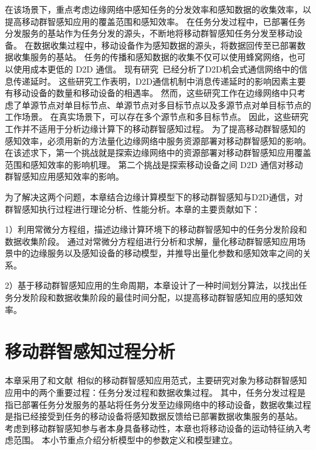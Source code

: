 在该场景下，重点考虑边缘网络中感知任务的分发效率和感知数据的收集效率，以提高移动群智感知应用的覆盖范围和感知效率。
在任务分发过程中，已部署任务分发服务的基站作为任务分发的源头，不断地将移动群智感知任务分发至移动设备。
在数据收集过程中，移动设备作为感知数据的源头，将数据回传至已部署数据收集服务的基站。
任务的传播和感知数据的收集不仅可以使用蜂窝网络，也可以使用成本更低的 D2D 通信。
现有研究~\cite{DBLP:conf/wcnc/QinF13,DBLP:journals/twc/LiW14,DBLP:journals/winet/ZhaoMLT18}已经分析了D2D机会式通信网络中的信息传递延时。
这些研究工作表明，D2D通信机制中消息传递延时的影响因素主要有移动设备的数量和移动设备的相遇率。
然而，这些研究工作在边缘网络中只考虑了单源节点对单目标节点、单源节点对多目标节点以及多源节点对单目标节点的工作场景。
在真实场景下，可以存在多个源节点和多目标节点。
因此，这些研究工作并不适用于分析边缘计算下的移动群智感知过程。
为了提高移动群智感知的感知效率，必须用新的方法量化边缘网络中服务资源部署对移动群智感知的影响。
在该述求下，第一个挑战就是探索边缘网络中的资源部署对移动群智感知应用覆盖范围和感知效率的影响机理。
第二个挑战是探索移动设备之间 D2D 通信对移动群智感知应用感知效率的影响。

为了解决这两个问题，本章结合边缘计算模型下的移动群智感知与D2D通信，对群智感知执行过程进行理论分析、性能分析。本章的主要贡献如下：

1）利用常微分方程组，描述边缘计算环境下的移动群智感知中的任务分发阶段和数据收集阶段。
通过对常微分方程组进行分析和求解，量化移动群智感知应用场景中的边缘服务以及感知设备的移动模型，并推导出量化参数和感知效率之间的关系。


2）基于移动群智感知应用的生命周期，本章设计了一种时间划分算法，以找出任务分发阶段和数据收集阶段的最佳时间分配，以提高移动群智感知应用的感知效率。


\section{移动群智感知过程分析}


本章采用了和文献~相似的移动群智感知应用范式，主要研究对象为移动群智感知应用中的两个重要过程：任务分发过程和数据收集过程。
其中，任务分发过程是指已部署任务分发服务的基站将任务分发至边缘网络中的移动设备，数据收集过程是指已经接受到任务的移动设备将感知数据反馈给已部署数据收集服务的基站。
考虑到移动群智感知参与者本身具备移动性，本章也将移动设备的运动特征纳入考虑范围。
本小节重点介绍分析模型中的参数定义和模型建立。

